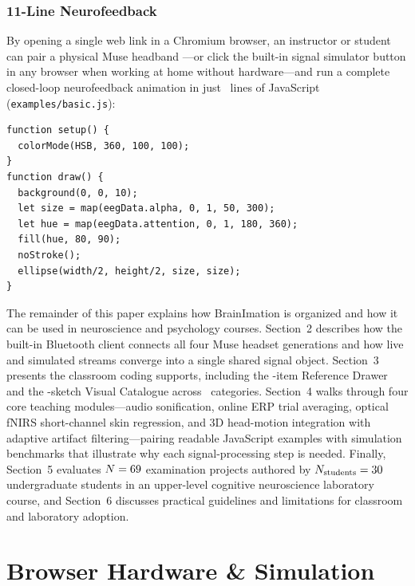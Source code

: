 \documentclass[11pt]{article}
\begin{document}
\subsubsection{11-Line Neurofeedback}
By opening a single web link in a Chromium browser, an instructor or student can pair a physical Muse headband \citep{krigolson2017choosing,kuziek2017transitioning,kuziek2018increasing}---or click the built-in signal simulator button in any browser when working at home without hardware---and run a complete closed-loop neurofeedback animation in just \ExLOCMin~lines of JavaScript (\texttt{examples/basic.js}):

\noindent\begin{minipage}{\textwidth}
\begin{lstlisting}
function setup() {
  colorMode(HSB, 360, 100, 100);
}
function draw() {
  background(0, 0, 10);
  let size = map(eegData.alpha, 0, 1, 50, 300);
  let hue = map(eegData.attention, 0, 1, 180, 360);
  fill(hue, 80, 90);
  noStroke();
  ellipse(width/2, height/2, size, size);
}
\end{lstlisting}
\end{minipage}
\vspace{4pt}

The remainder of this paper explains how BrainImation is organized and how it can be used in neuroscience and psychology courses. Section~2 describes how the built-in Bluetooth client connects all four Muse headset generations and how live and simulated streams converge into a single shared signal object. Section~3 presents the classroom coding supports, including the \NRefAPIs-item Reference Drawer and the \NCatalogueSketches-sketch Visual Catalogue across \NCatalogueCategories\ categories. Section~4 walks through four core teaching modules---audio sonification, online ERP trial averaging, optical fNIRS short-channel skin regression, and 3D head-motion integration with adaptive artifact filtering---pairing readable JavaScript examples with simulation benchmarks that illustrate why each signal-processing step is needed. Finally, Section~5 evaluates $N = 69$ examination projects authored by $N_{\text{students}} = 30$ undergraduate students in an upper-level cognitive neuroscience laboratory course, and Section~6 discusses practical guidelines and limitations for classroom and laboratory adoption.

\section{Browser Hardware \& Simulation}
\end{document}

